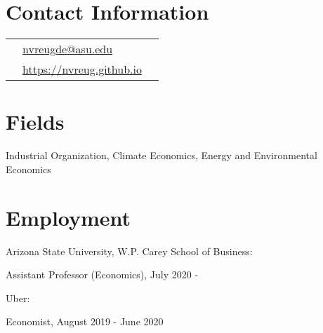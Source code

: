 \documentclass[margin,line]{res}
\newenvironment{list1}{
  \begin{list}{\ding{113}}{%
      \setlength{\itemsep}{.025in}
      \setlength{\parsep}{0in} \setlength{\parskip}{0in}
      \setlength{\topsep}{0in} \setlength{\partopsep}{0in}
      \setlength{\leftmargin}{0.17in}}}{\end{list}}
\begin{document}


\begin{resume}
\thispagestyle{plain} %

\section{ Contact Information}
\vspace{.05in}
\begin{tabular}{@{}p{0.20in}p{2.75in}p{2.75in}}
 &  \href{mailto: nvreugde@asu.edu}{nvreugde@asu.edu}   & \\
 &\href{https://nvreug.github.io}{https://nvreug.github.io} & \\ 
\end{tabular}

\section{ Fields}
\begin{list1}
\item[] Industrial Organization, Climate Economics, Energy and Environmental Economics
\vspace*{.05in}
\end{list1}

\section{ Employment}
\begin{list1}
	\item[] Arizona State University, W.P. Carey School of Business: 
	\item[] \hspace{11pt} Assistant Professor (Economics), July 2020 -
	\item[] Uber: 
	\item[] \hspace{11pt} Economist, August 2019 - June 2020
	\vspace*{.05in}
\end{list1}


\end{resume}
\end{document}
